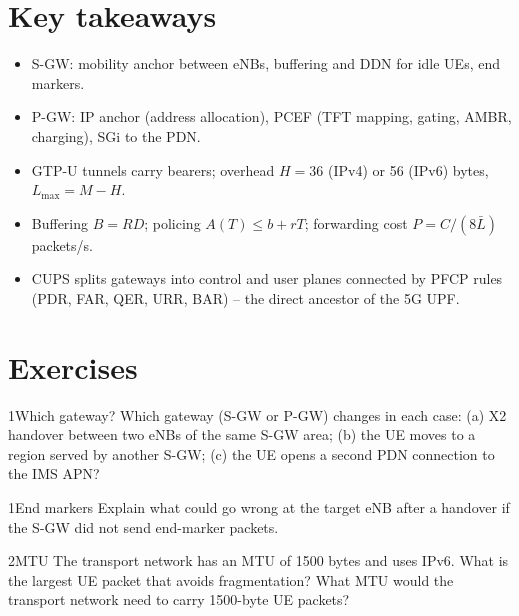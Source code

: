 \documentclass[11pt,a4paper]{article}
\begin{document}
\section{Key takeaways}
\begin{takeawaybox}
\begin{itemize}
  \item S-GW: mobility anchor between eNBs, buffering and DDN for idle UEs, end markers.
  \item P-GW: IP anchor (address allocation), PCEF (TFT mapping, gating, AMBR, charging), SGi to the PDN.
  \item GTP-U tunnels carry bearers; overhead $H = 36$ (IPv4) or 56 (IPv6) bytes, $L_{\max} = M - H$.
  \item Buffering $B = RD$; policing $A(T) \le b + rT$; forwarding cost $P = C/(8\bar L)$ packets/s.
  \item CUPS splits gateways into control and user planes connected by PFCP rules (PDR, FAR, QER, URR, BAR)
        -- the direct ancestor of the 5G UPF.
\end{itemize}
\end{takeawaybox}

\section{Exercises}

\begin{exercisebox}{1}{Which gateway?}\label{exr:roles}
Which gateway (S-GW or P-GW) changes in each case: (a) X2 handover between two eNBs of the same S-GW
area; (b) the UE moves to a region served by another S-GW; (c) the UE opens a second PDN connection to the
IMS APN?
\end{exercisebox}

\begin{exercisebox}{1}{End markers}\label{exr:endmarker}
Explain what could go wrong at the target eNB after a handover if the S-GW did not send end-marker packets.
\end{exercisebox}

\begin{exercisebox}{2}{MTU}\label{exr:mtu}
The transport network has an MTU of 1500 bytes and uses IPv6. What is the largest UE packet that avoids
fragmentation? What MTU would the transport network need to carry 1500-byte UE packets?
\end{exercisebox}
\end{document}
